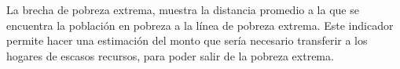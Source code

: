 La brecha de pobreza extrema, muestra la distancia promedio a la que se encuentra la población en pobreza a la línea de pobreza extrema. Este indicador permite hacer una estimación del monto que sería necesario transferir a los hogares de escasos recursos, para poder salir de la pobreza extrema.